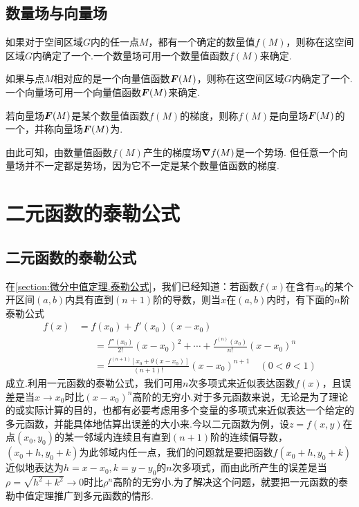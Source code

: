 \subsection{数量场与向量场}
\begin{definition}
如果对于空间区域\(G\)内的任一点\(M\)，都有一个确定的数量值\(f(M)\)，则称在这空间区域\(G\)内确定了一个.一个数量场可用一个数量值函数\(f(M)\)来确定.

如果与点\(M\)相对应的是一个向量值函数\(\boldsymbol{F}(M)\)，则称在这空间区域\(G\)内确定了一个.一个向量场可用一个向量值函数\(\boldsymbol{F}(M)\)来确定.

若向量场\(\boldsymbol{F}(M)\)是某个数量值函数\(f(M)\)的梯度，则称\(f(M)\)是向量场\(\boldsymbol{F}(M)\)的一个，并称向量场\(\boldsymbol{F}(M)\)为.
\end{definition}
由此可知，由数量值函数\(f(M)\)产生的梯度场\(\grad f(M)\)是一个势场.
但任意一个向量场并不一定都是势场，因为它不一定是某个数量值函数的梯度.

\section{二元函数的泰勒公式}
\subsection{二元函数的泰勒公式}
在\cref{section:微分中值定理.泰勒公式}，我们已经知道：若函数\(f(x)\)在含有\(x_0\)的某个开区间\((a,b)\)内具有直到\((n+1)\)阶的导数，则当\(x\)在\((a,b)\)内时，有下面的\(n\)阶泰勒公式\begin{align*}
f(x) &= f(x_0) + f'(x_0) (x-x_0) \\
&\hspace{20pt}=\frac{f''(x_0)}{2!} (x-x_0)^2 + \dotsb + \frac{f^{(n)}(x_0)}{n!} (x-x_0)^n \\
&\hspace{20pt}=\frac{f^{(n+1)}[x_0+\theta(x-x_0)]}{(n+1)!} (x-x_0)^{n+1}
\quad(0<\theta<1)
\end{align*}成立.利用一元函数的泰勒公式，我们可用\(n\)次多项式来近似表达函数\(f(x)\)，且误差是当\(x \to x_0\)时比\((x-x_0)^n\)高阶的无穷小.对于多元函数来说，无论是为了理论的或实际计算的目的，也都有必要考虑用多个变量的多项式来近似表达一个给定的多元函数，并能具体地估算出误差的大小来.今以二元函数为例，设\(z=f(x,y)\)在点\((x_0,y_0)\)的某一邻域内连续且有直到\((n+1)\)阶的连续偏导数，\((x_0+h,y_0+k)\)为此邻域内任一点，我们的问题就是要把函数\(f(x_0+h,y_0+k)\)近似地表达为\(h=x-x_0,k=y-y_0\)的\(n\)次多项式，而由此所产生的误差是当\(\rho=\sqrt{h^2+k^2}\to0\)时比\(\rho^n\)高阶的无穷小.为了解决这个问题，就要把一元函数的泰勒中值定理推广到多元函数的情形.

